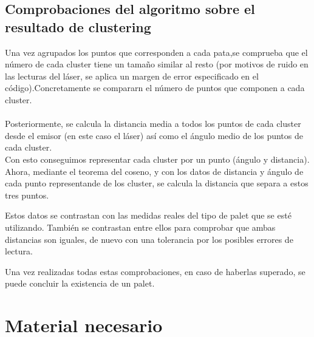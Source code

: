 \subsection{Comprobaciones del algoritmo sobre el resultado de clustering}
Una vez agrupados los puntos que corresponden a cada pata,se comprueba que el número de cada cluster tiene un tamaño similar al resto (por motivos de ruido en las lecturas del láser, se aplica un margen de error especificado en el código).Concretamente se compararn el número de puntos que componen a cada cluster.\\ \\
Posteriormente, se calcula la distancia media a todos los puntos de cada cluster desde el emisor (en este caso el láser) así como el ángulo medio de los puntos de cada cluster.\\
Con esto conseguimos representar cada cluster por un punto (ángulo y distancia).\\
Ahora, mediante el teorema del coseno, y con los datos de distancia y ángulo de cada punto representande de los cluster, se calcula la distancia que separa a estos tres puntos.\\


 Estos datos se contrastan con las medidas reales del tipo de palet que se esté utilizando. También se contrastan entre ellos para comprobar que ambas distancias son iguales, de nuevo con una tolerancia por los posibles errores de lectura.\\



Una vez realizadas todas estas comprobaciones, en caso de haberlas superado, se puede concluir la existencia de un palet.


		









\section{Material necesario}

